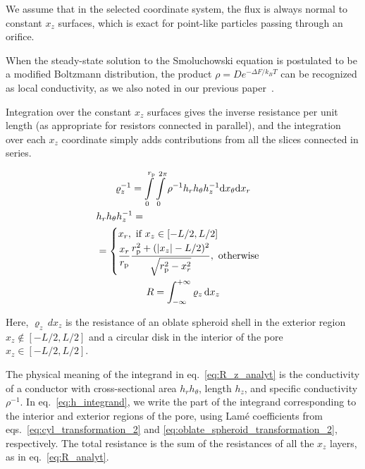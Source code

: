 \documentclass[10pt, a4paper]{article}
\begin{document}
\begin{multicols}{2}
We assume that in the selected coordinate system, the flux is always normal to constant $x_z$ surfaces, which is exact for point-like particles passing through an orifice.

When the steady-state solution to the Smoluchowski equation is postulated to be a modified Boltzmann distribution, the product $\rho = D e^{-\Delta F / k_B T}$ can be recognized as local conductivity, as we also noted in our previous paper~\cite{Laktionov2023}.

Integration over the constant $x_z$ surfaces gives the inverse resistance per unit length (as appropriate for resistors connected in parallel), and the integration over each $x_z$ coordinate simply adds contributions from all the slices connected in series.

\begin{gather}
    \label{eq:R_z_analyt}
    \varrho_{z}^{-1} = \int\displaylimits_{0}^{r_{\text{p}}} \int\displaylimits_{0}^{2\pi} \rho^{-1} h_r h_{\theta} h_z^{-1} \text{d}x_{\theta} \text{d}x_r
    \\
    \label{eq:h_integrand}
    \begin{aligned} 
        &h_r h_{\theta} h_z^{-1} = \\ &=
        \begin{cases}
            x_r, \text{ if } x_z \in [-L/2,L/2]
            \\[2pt]
            \dfrac{x_r}{r_{\text{p}}}\dfrac{r_{\text{p}}^2 + (|x_z|-L/2)^2}{\sqrt{r_{\text{p}}^2 - x_r^2}}, \text{ otherwise}
        \end{cases}
    \end{aligned}
    \\
    \label{eq:R_analyt}
    R = \int_{-\infty}^{+\infty} \varrho_{z} \, \text{d}x_z
\end{gather}

Here, $\varrho_{z} \, dx_z$ is the resistance of an oblate spheroid shell in the exterior region $x_z \notin [-L/2, L/2]$ and a circular disk in the interior of the pore $x_z \in [-L/2, L/2]$.

The physical meaning of the integrand in eq.~\ref{eq:R_z_analyt} is the conductivity of a conductor with cross-sectional area $h_r h_{\theta}$, length $h_z$, and specific conductivity $\rho^{-1}$.
In eq.~\ref{eq:h_integrand}, we write the part of the integrand corresponding to the interior and exterior regions of the pore, using Lam\'e coefficients from eqs.~\ref{eq:cyl_transformation_2} and \ref{eq:oblate_spheroid_transformation_2}, respectively.
The total resistance is the sum of the resistances of all the $x_z$ layers, as in eq.~\ref{eq:R_analyt}.


\end{multicols}
\end{document}

